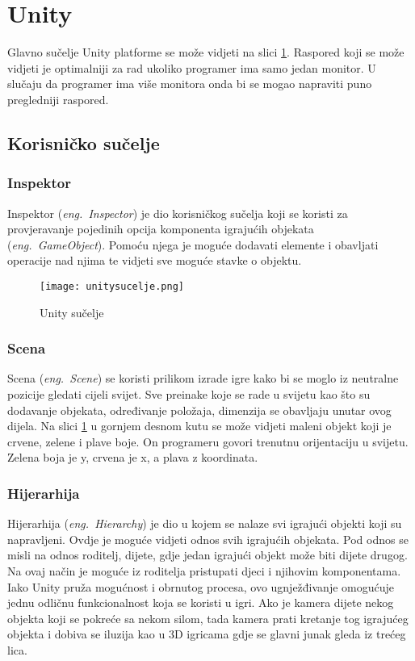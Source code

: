 \section{Unity}
Glavno sučelje Unity platforme se može vidjeti na slici \ref{fig:unitysucelje}. Raspored koji se može vidjeti je optimalniji za rad ukoliko programer ima samo jedan monitor. U slučaju da programer ima više monitora onda bi se mogao napraviti puno pregledniji raspored. 
\subsection{Korisničko sučelje}
\subsubsection{Inspektor}
Inspektor (\emph{eng.~Inspector}) je dio korisničkog sučelja koji se koristi za provjeravanje pojedinih opcija komponenta igrajućih objekata (\emph{eng.~GameObject}). Pomoću njega je moguće dodavati elemente i obavljati operacije nad njima te vidjeti sve moguće stavke o objektu.

\begin{figure}[h]
	\texttt{[image: unitysucelje.png]}
	\centering
	\caption{Unity sučelje}
	\label{fig:unitysucelje}
\end{figure}
\newpage

\subsubsection{Scena}
Scena (\emph{eng.~Scene}) se koristi prilikom izrade igre kako bi se moglo iz neutralne pozicije gledati cijeli svijet. Sve preinake koje se rade u svijetu kao što su dodavanje objekata, određivanje položaja, dimenzija se obavljaju unutar ovog dijela. Na slici \ref{fig:unitysucelje} u gornjem desnom kutu se može vidjeti maleni objekt koji je crvene, zelene i plave boje. On programeru govori trenutnu orijentaciju u svijetu. Zelena boja je y, crvena je x, a plava z koordinata.

\subsubsection{Hijerarhija}
Hijerarhija (\emph{eng.~Hierarchy}) je dio u kojem se nalaze svi igrajući objekti koji su napravljeni. Ovdje je moguće vidjeti odnos svih igrajućih objekata. Pod odnos se misli na odnos roditelj, dijete, gdje jedan igrajući objekt može biti dijete drugog. Na ovaj način je moguće iz roditelja pristupati djeci i njihovim komponentama. Iako Unity pruža mogućnost i obrnutog procesa, ovo ugnježđivanje omogućuje jednu odličnu funkcionalnost koja se koristi u igri. Ako je kamera dijete nekog objekta koji se pokreće sa nekom silom, tada kamera prati kretanje tog igrajućeg objekta i dobiva se iluzija kao u 3D igricama gdje se glavni junak gleda iz trećeg lica. 

